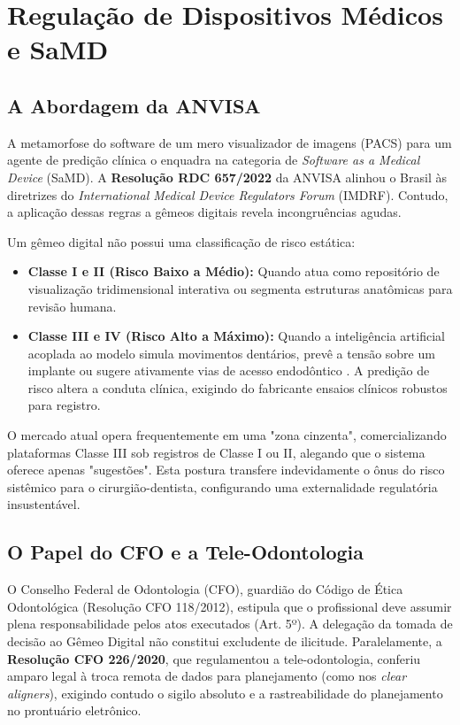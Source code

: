 \section{Regulação de Dispositivos Médicos e SaMD}
\label{sec:regulacao}

\subsection{A Abordagem da ANVISA}

A metamorfose do software de um mero visualizador de imagens (PACS) para um agente de predição clínica o enquadra na categoria de \textit{Software as a Medical Device} (SaMD). A \textbf{Resolução RDC 657/2022} da ANVISA alinhou o Brasil às diretrizes do \textit{International Medical Device Regulators Forum} (IMDRF). Contudo, a aplicação dessas regras a gêmeos digitais revela incongruências agudas.

Um gêmeo digital não possui uma classificação de risco estática:
\begin{itemize}
    \item \textbf{Classe I e II (Risco Baixo a Médio):} Quando atua como repositório de visualização tridimensional interativa ou segmenta estruturas anatômicas para revisão humana.
    \item \textbf{Classe III e IV (Risco Alto a Máximo):} Quando a inteligência artificial acoplada ao modelo simula movimentos dentários, prevê a tensão sobre um implante ou sugere ativamente vias de acesso endodôntico \cite{elsaid2026digital}. A predição de risco altera a conduta clínica, exigindo do fabricante ensaios clínicos robustos para registro.
\end{itemize}

O mercado atual opera frequentemente em uma "zona cinzenta", comercializando plataformas Classe III sob registros de Classe I ou II, alegando que o sistema oferece apenas "sugestões". Esta postura transfere indevidamente o ônus do risco sistêmico para o cirurgião-dentista, configurando uma externalidade regulatória insustentável.

\subsection{O Papel do CFO e a Tele-Odontologia}

O Conselho Federal de Odontologia (CFO), guardião do Código de Ética Odontológica (Resolução CFO 118/2012), estipula que o profissional deve assumir plena responsabilidade pelos atos executados (Art. 5º). A delegação da tomada de decisão ao Gêmeo Digital não constitui excludente de ilicitude. Paralelamente, a \textbf{Resolução CFO 226/2020}, que regulamentou a tele-odontologia, conferiu amparo legal à troca remota de dados para planejamento (como nos \textit{clear aligners}), exigindo contudo o sigilo absoluto e a rastreabilidade do planejamento no prontuário eletrônico.

